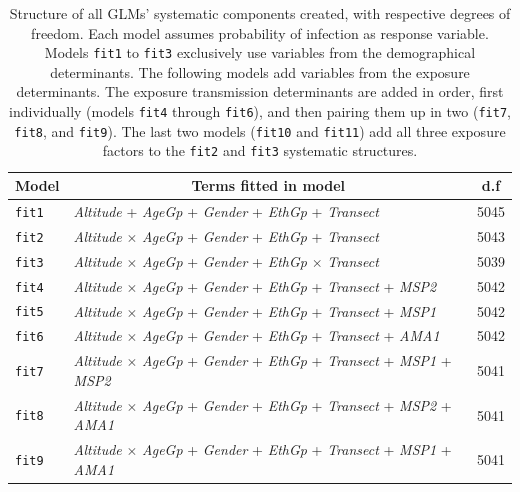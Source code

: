 \begin{table}[ht!]
\centering
\caption[Structure of systematic components used in the GLMs]{Structure of all GLMs' systematic components created, with respective degrees of freedom. Each model assumes probability of infection as response variable. Models \texttt{fit1} to \texttt{fit3} exclusively use variables from the demographical determinants. The following models add variables from the exposure determinants. The exposure transmission determinants are added in order, first individually (models \texttt{fit4} through \texttt{fit6}), and then pairing them up in two (\texttt{fit7}, \texttt{fit8}, and \texttt{fit9}). The last two models (\texttt{fit10} and \texttt{fit11}) add all three exposure factors to the \texttt{fit2} and \texttt{fit3} systematic structures.}
\label{tab:glm.formulas}
\begin{adjustbox}{width=\linewidth}
\begin{tabular}{llc} 
\toprule
Model   &  \multicolumn{1}{c}{Terms fitted in model}   &   d.f  \\
\midrule
\texttt{fit1}   & \textit{Altitude} + \textit{AgeGp} + \textit{Gender} + \textit{EthGp} + \textit{Transect}   & 5045   \\
\texttt{fit2}   & \textit{Altitude} $\times$ \textit{AgeGp} + \textit{Gender} + \textit{EthGp} + \textit{Transect}   & 5043   \\
\texttt{fit3}   & \textit{Altitude} $\times$ \textit{AgeGp} + \textit{Gender} + \textit{EthGp} $\times$ \textit{Transect}   & 5039   \\
\texttt{fit4}   & \textit{Altitude} $\times$ \textit{AgeGp} + \textit{Gender} + \textit{EthGp} + \textit{Transect} + \textit{MSP2}  & 5042   \\
\texttt{fit5}   & \textit{Altitude} $\times$ \textit{AgeGp} + \textit{Gender} + \textit{EthGp} + \textit{Transect} + \textit{MSP1}   & 5042   \\
\texttt{fit6}   & \textit{Altitude} $\times$ \textit{AgeGp} + \textit{Gender} + \textit{EthGp} + \textit{Transect} + \textit{AMA1}   & 5042   \\
\texttt{fit7}   & \textit{Altitude} $\times$ \textit{AgeGp} + \textit{Gender} + \textit{EthGp} + \textit{Transect} + \textit{MSP1} + \textit{MSP2}  & 5041   \\
\texttt{fit8}   & \textit{Altitude} $\times$ \textit{AgeGp} + \textit{Gender} + \textit{EthGp} + \textit{Transect} + \textit{MSP2} + \textit{AMA1}  & 5041   \\
\texttt{fit9}   & \textit{Altitude} $\times$ \textit{AgeGp} + \textit{Gender} + \textit{EthGp} + \textit{Transect} + \textit{MSP1} + \textit{AMA1}   & 5041   \\

\end{tabular}
\end{adjustbox}
\end{table}
